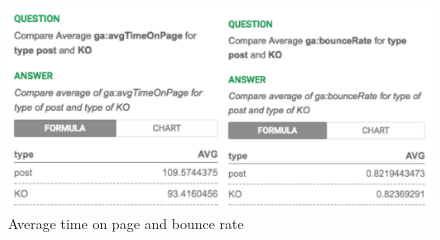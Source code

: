 \documentclass[runningheads,a4paper]{llncs}
\makeatletter
\def\maxwidth#1{\ifdim\Gin@nat@width>#1 #1\else\Gin@nat@width\fi}
\makeatother
\begin{document}
\begin{figure}[h!]
\centering
\includegraphics[width=\maxwidth{\textwidth}]{img/10000201000004BF00000243FF3F4AB2.png}
\cprotect\caption{Average time on page and bounce rate}
\label{}
\end{figure}
\end{document}
